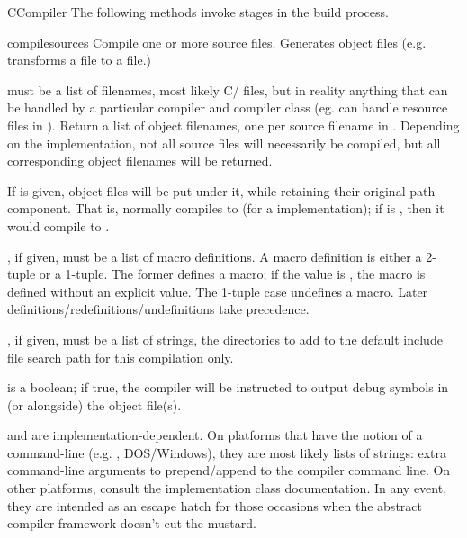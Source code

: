 \documentclass{manual}
\begin{document}
\begin{classdesc}{CCompiler}{}
The following methods invoke stages in the build process.

\begin{methoddesc}{compile}{sources}
Compile one or more source files. Generates object files (e.g. 
transforms a  file to a  file.)

 must be a list of filenames, most likely C/\Cpp
files, but in reality anything that can be handled by a
particular compiler and compiler class (eg.  can
handle resource files in ).  Return a list of object
filenames, one per source filename in .  Depending on
the implementation, not all source files will necessarily be
compiled, but all corresponding object filenames will be
returned.

If  is given, object files will be put under it, while
retaining their original path component.  That is, 
normally compiles to  (for a \UNIX{} implementation); if
 is , then it would compile to
.

, if given, must be a list of macro definitions.  A macro
definition is either a  2-tuple or a
 1-tuple.
The former defines a macro; if the value is , the macro is
defined without an explicit value.  The 1-tuple case undefines a
macro.  Later definitions/redefinitions/undefinitions take
precedence.

, if given, must be a list of strings, the
directories to add to the default include file search path for this
compilation only.

 is a boolean; if true, the compiler will be instructed to
output debug symbols in (or alongside) the object file(s).

 and  are implementation-dependent.
On platforms that have the notion of a command-line (e.g. \UNIX,
DOS/Windows), they are most likely lists of strings: extra
command-line arguments to prepend/append to the compiler command
line.  On other platforms, consult the implementation class
documentation.  In any event, they are intended as an escape hatch
for those occasions when the abstract compiler framework doesn't
cut the mustard.


\end{methoddesc}
\end{classdesc}
\end{document}
